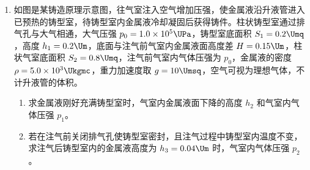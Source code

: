 \documentclass[\gkver]{gaokaozhenti}
\begin{document}
\begin{enumerate}
{（2）①滑动变阻器 $R_{\mathrm{P}}$ 的滑片 P 置于 b 端时滑动变阻器的电阻最大，电路中的电流最小，保护电路安全。

②电流表读数为 $0.48 \UA$。

③根据题图中数据可知 $B-I$ 图线斜率为 $k = \frac{15.2 - 5.6}{0.5 - 0.18} \UmT/\UA = 30 \UmT/\UA$。

（3）利用图（b）所示装置测量了 $t$，结果表明 $B$ 越大，$t$ 越小。
}

\item
如图是某铸造原理示意图，往气室注入空气增加压强，使金属液沿升液管进入已预热的铸型室，待铸型室内金属液冷却凝固后获得铸件。柱状铸型室通过排气孔与大气相通，大气压强 $p_{0} = 1.0\times10^{5} \UPa$，铸型室底面积 $S_{1} = 0.2 \Umq$，高度 $h_{1} = 0.2 \Um$，底面与注气前气室内金属液面高度差 $H = 0.15 \Um$，柱状气室底面积 $S_{2} = 0.8 \Umq$，注气前气室内气体压强为 $p_{0}$，金属液的密度 $\rho = 5.0\times10^{3} \Ukgmc$，重力加速度取 $g = 10 \Umsq$，空气可视为理想气体，不计升液管的体积。

\begin{enumerate}
\item
求金属液刚好充满铸型室时，气室内金属液面下降的高度 $h_{2}$ 和气室内气体压强 $p_{1}$。
\item
若在注气前关闭排气孔使铸型室密封，且注气过程中铸型室内温度不变，求注气后铸型室内的金属液高度为 $h_{3} = 0.04 \Um$ 时，气室内气体压强 $p_{2}$。
\end{enumerate}


\end{enumerate}
\end{document}
